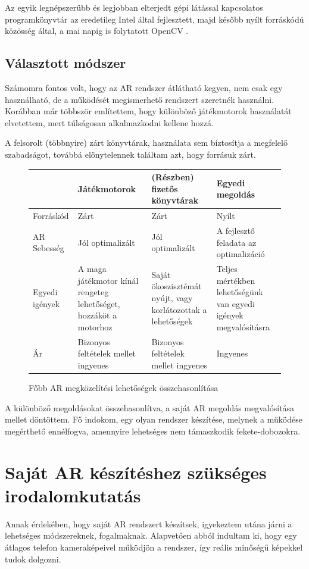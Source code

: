 \documentclass[12pt,a4paper,oneside]{report} %
\begin{document}
\par Az egyik legnépszerűbb és  legjobban elterjedt gépi látással kapcsolatos programkönyvtár az eredetileg Intel által fejlesztett,  majd később nyílt forráskódú közösség által, a mai napig is folytatott OpenCV \cite{opencv_library}.
\subsection{Választott módszer}
Számomra fontos volt, hogy az AR rendszer átlátható kegyen, nem csak egy használható, de a működését megismerhető rendszert szeretnék használni. Korábban már többször említettem, hogy különböző játékmotorok használatát elvetettem, mert túlságosan alkalmazkodni kellene hozzá. 
\par A felsorolt (többnyire) zárt könyvtárak, használata sem biztosítja a megfelelő szabadságot, továbbá előnytelennek találtam azt, hogy forrásuk zárt.


\begin{figure}[H]
	\centering
	\begin{tabular}{s|p{3.5cm}|p{3.5cm}|p{3.5cm} }
	& Játékmotorok &(Részben) fizetős könyvtárak &  Egyedi megoldás \\
	\hline
	Forráskód & Zárt & Zárt & Nyílt \\
	AR Sebesség & Jól optimalizált & Jól optimalizált & A fejlesztő feladata az optimalizáció \\
	Egyedi igények   & A maga játékmotor kínál rengeteg lehetőséget, hozzáköt a motorhoz & Saját ökoszisztémát nyújt, vagy korlátozottak a lehetőségek   & Teljes mértékben lehetőségünk van egyedi igények megvalósításra  \\
	Ár & Bizonyos feltételek mellet ingyenes & Bizonyos feltételek mellet ingyenes & Ingyenes\\

	\end{tabular}
	\caption{Főbb AR megközelítési lehetőségek összehasonlítása}
\end{figure}

A különböző megoldásokat összehasonlítva, a saját AR megoldás megvalósítása mellet döntöttem. Fő indokom, egy olyan rendszer készítése, melynek a működése megérthető ennélfogva, amennyire lehetséges nem támaszkodik fekete-dobozokra.

\section{Saját AR készítéshez szükséges irodalomkutatás}
Annak érdekében, hogy saját AR rendszert készítsek, igyekeztem utána járni a lehetséges módszereknek, fogalmaknak.
Alapvetően abból indultam ki, hogy egy átlagos telefon kameraképeivel működjön a rendszer, így reális minőségű képekkel tudok dolgozni.
\end{document}
